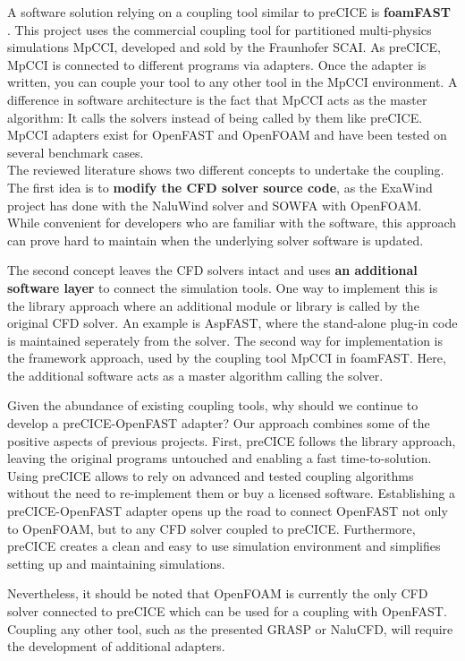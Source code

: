 A software solution relying on a coupling tool similar to preCICE is \textbf{foamFAST} \cite{Weber:2017}. This project uses the commercial coupling tool for partitioned multi-physics simulations MpCCI, developed and sold by the Fraunhofer SCAI. As preCICE, MpCCI is connected to different programs via adapters. Once the adapter is written, you can couple your tool to any other tool in the MpCCI environment. A difference in software architecture is the fact that MpCCI acts as the master algorithm: It calls the solvers instead of being called by them like preCICE. MpCCI adapters exist for OpenFAST and OpenFOAM and have been tested on several benchmark cases.\\

The reviewed literature shows two different concepts to undertake the coupling. The first idea is to \textbf{modify the CFD solver source code}, as the ExaWind project has done with the NaluWind solver and SOWFA with OpenFOAM. While convenient for developers who are familiar with the software, this approach can prove hard to maintain when the underlying solver software is updated.

The second concept leaves the CFD solvers intact and uses \textbf{an additional software layer} to connect the simulation tools. One way to implement this is the library approach where an additional module or library is called by the original CFD solver. An example is AspFAST, where the stand-alone plug-in code is maintained seperately from the solver. The second way for implementation is the framework approach, used by the coupling tool MpCCI in foamFAST. Here, the additional software acts as a master algorithm calling the solver.

Given the abundance of existing coupling tools, why should we continue to develop a preCICE-OpenFAST adapter? Our approach combines some of the positive aspects of previous projects. First, preCICE follows the library approach, leaving the original programs untouched and enabling a fast time-to-solution. Using preCICE allows to rely on advanced and tested coupling algorithms without the need to re-implement them or buy a licensed software. Establishing a preCICE-OpenFAST adapter opens up the road to connect OpenFAST not only to OpenFOAM, but to any CFD solver coupled to preCICE. Furthermore, preCICE creates a clean and easy to use simulation environment and simplifies setting up and maintaining simulations.

Nevertheless, it should be noted that OpenFOAM is currently the only CFD solver connected to preCICE which can be used for a coupling with OpenFAST. Coupling any other tool, such as the presented GRASP or NaluCFD, will require the development of additional adapters.

